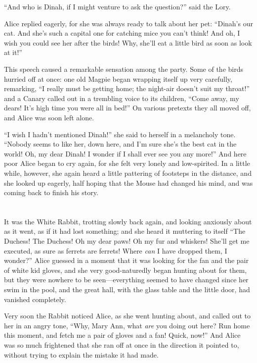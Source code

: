 \documentclass[book, 20pt]{extbook}
\begin{document}
``And who is Dinah, if I might venture to ask the question?'' said the
Lory.

Alice replied eagerly, for she was always ready to talk about her pet:
``Dinah's our cat. And she's such a capital one for catching mice you
can't think! And oh, I wish you could see her after the birds! Why,
she'll eat a little bird as soon as look at it!''

This speech caused a remarkable sensation among the party. Some of the
birds hurried off at once: one old Magpie began wrapping itself up very
carefully, remarking, ``I really must be getting home; the night-air
doesn't suit my throat!'' and a Canary called out in a trembling voice
to its children, ``Come away, my dears! It's high time you were all in
bed!'' On various pretexts they all moved off, and Alice was soon left
alone.

``I wish I hadn't mentioned Dinah!'' she said to herself in a melancholy
tone. ``Nobody seems to like her, down here, and I'm sure she's the best
cat in the world! Oh, my dear Dinah! I wonder if I shall ever see you
any more!'' And here poor Alice began to cry again, for she felt very
lonely and low-spirited. In a little while, however, she again heard a
little pattering of footsteps in the distance, and she looked up
eagerly, half hoping that the Mouse had changed his mind, and was coming
back to finish his story.

\chapter*{}


It was the White Rabbit, trotting slowly back again, and looking
anxiously about as it went, as if it had lost something; and she heard
it muttering to itself ``The Duchess! The Duchess! Oh my dear paws! Oh
my fur and whiskers! She'll get me executed, as sure as ferrets are
ferrets! Where \emph{can} I have dropped them, I wonder?'' Alice guessed
in a moment that it was looking for the fan and the pair of white kid
gloves, and she very good-naturedly began hunting about for them, but
they were nowhere to be seen---everything seemed to have changed since
her swim in the pool, and the great hall, with the glass table and the
little door, had vanished completely.

Very soon the Rabbit noticed Alice, as she went hunting about, and
called out to her in an angry tone, ``Why, Mary Ann, what \emph{are} you
doing out here? Run home this moment, and fetch me a pair of gloves and
a fan! Quick, now!'' And Alice was so much frightened that she ran off
at once in the direction it pointed to, without trying to explain the
mistake it had made.
\end{document}
